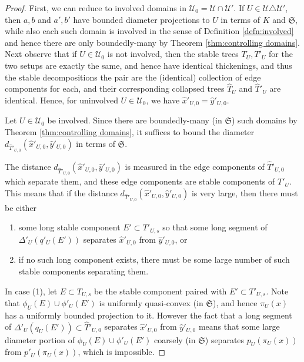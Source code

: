 \documentclass{amsart}
\theoremstyle{definition}
\theoremstyle{remark}
\theoremstyle{definition}
\newcommand{\calU}{\mathcal{U}}
\newcommand{\hT}{\widehat{T}}
\newcommand{\hx}{\hat{x}}
\newcommand{\hy}{\hat{y}}
\begin{document}
\begin{proof}
First, we can reduce to involved domains in $\calU_0 = \calU \cap \calU'$.  If $U \in \calU \triangle \calU'$, then $a,b$ and $a',b'$ have bounded diameter projections to $U$ in terms of $K$ and $\mathfrak S$, while also each such domain is involved in the sense of Definition \ref{defn:involved} and hence there are only boundedly-many by Theorem \ref{thm:controlling domains}. Next observe that if $U \in \calU_0$ is not involved, then the stable trees $T_U, T'_U$ for the two setups are exactly the same, and hence have identical thickenings, and thus the stable decompositions the pair are the (identical) collection of edge components for each, and their corresponding collapsed trees $\hT_U$ and $\hT'_U$ are identical.  Hence, for uninvolved $U \in \calU_0$, we have $\hx'_{U,0} = \hy'_{U,0}$.

Let $U \in \calU_0$ be involved.  Since there are boundedly-many (in $\mathfrak S$) such domains by Theorem \ref{thm:controlling domains}, it suffices to bound the diameter $d_{\hT'_{U,0}}(\hx'_{U,0}, \hy'_{U,0})$ in terms of $\mathfrak S$.

  The distance $d_{\hT'_{U,0}}(\hx'_{U,0}, \hy'_{U,0})$ is measured in the edge components of $\hT'_{U,0}$ which separate them, and these edge components are stable components of $T'_U$.  This means that if the distance $d_{\hT'_{U,0}}(\hx'_{U,0}, \hy'_{U,0})$ is very large, then there must be either 
\begin{enumerate}
\item some long stable component $E' \subset T'_{U,s}$ so that some long segment of $\Delta'_U(q'_U(E'))$ separates $\hx'_{U,0}$ from $\hy'_{U,0}$, or
\item if no such long component exists, there must be some large number of such stable components separating them.
\end{enumerate}

In case (1), let $E \subset T_{U,s}$ be the stable component paired with $E' \subset T'_{U,s}$.  Note that $\phi_U(E) \cup \phi'_U(E')$ is uniformly quasi-convex (in $\mathfrak S$), and hence $\pi_U(x)$ has a uniformly bounded projection to it.  However the fact that a long segment of $\Delta'_U(q_U(E')) \subset \hT'_{U,0}$ separates $\hx'_{U,0}$ from $\hy'_{U,0}$ means that some large diameter portion of $\phi_U(E) \cup \phi'_U(E')$ coarsely (in $\mathfrak S$) separates $p_U(\pi_U(x))$ from $p'_U(\pi_U(x))$, which is impossible.


\end{proof}
\end{document}
